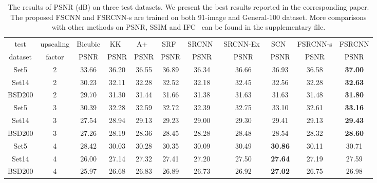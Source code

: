 \documentclass[runningheads]{llncs}
\begin{document}
\begin{table*}\scriptsize
\caption{The results of PSNR (dB) on three test datasets. We present the best results reported in the corresponding paper. The proposed FSCNN and FSRCNN-s are trained on both 91-image and General-100 dataset. More comparisons with other methods on PSNR, SSIM and IFC~\cite{sheikh2005information} can be found in the supplementary file.}
\label{results}
\begin{center}
\begin{tabular}{|c|c|c|c|c|c|c|c|c|c|c|}
\hline
 test & upscaling &  {Bicubic} &  KK~\cite{Kim2010} &  A+~\cite{Timofte2014} & {SRF~\cite{Schulter2015}} &  {SRCNN~\cite{Dong2014}} &  {SRCNN-Ex~\cite{Dong2015}} &{SCN~\cite{Wang2015}} & {FSRCNN-s} & {FSRCNN}\\
 \cline{3-11}
 dataset & factor & PSNR & PSNR & PSNR  &PSNR  & PSNR  &PSNR & PSNR  &PSNR & PSNR \\

\hline\hline
Set5 & 2 & 33.66 & 36.20 & 36.55 & 36.89 & 36.34 & 36.66 & 36.93 & 36.58 & \textbf{37.00} \\
Set14 & 2 & 30.23 & 32.11 & 32.28 & 32.52 & 32.18 & 32.45 & 32.56 & 32.28 & \textbf{32.63} \\
BSD200 & 2 & 29.70 & 31.30 & 31.44 & 31.66 & 31.38 & 31.63 & 31.63 & 31.48 & \textbf{31.80} \\
\hline\hline

Set5 & 3 & 30.39 & 32.28 & 32.59 & 32.72 & 32.39 & 32.75 & 33.10 & 32.61 & \textbf{33.16} \\
Set14 & 3 & 27.54 & 28.94 & 29.13 & 29.23 & 29.00 & 29.30 & 29.41 & 29.13 & \textbf{29.43} \\
BSD200 & 3 & 27.26 & 28.19 & 28.36 & 28.45 & 28.28 & 28.48 & 28.54 & 28.32 & \textbf{28.60} \\
\hline\hline

Set5 & 4 & 28.42 & 30.03 & 30.28 & 30.35 & 30.09 & 30.49 & \textbf{30.86} & 30.11 & 30.71 \\
Set14 & 4 & 26.00 & 27.14 & 27.32 & 27.41 & 27.20 & 27.50 & \textbf{27.64} & 27.19 & 27.59 \\
BSD200 & 4 & 25.97 & 26.68 & 26.83 & 26.89 & 26.73 & 26.92 & \textbf{27.02} & 26.75 & 26.98 \\
\hline
\end{tabular}
\end{center}
\end{table*}
\end{document}
